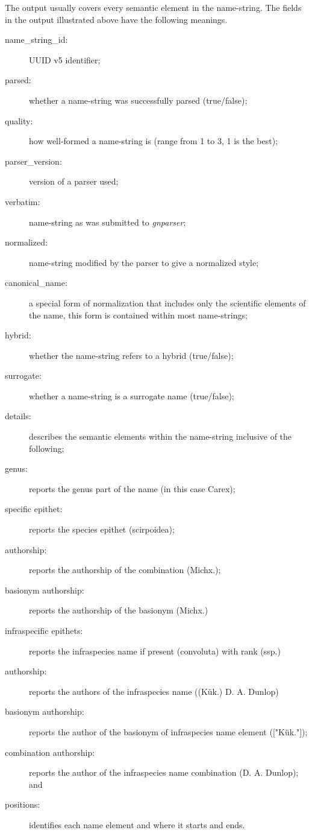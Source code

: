 \documentclass{bmcart}
\begin{document}
The output usually covers every semantic element in the name-string. The fields in the output illustrated above have the following meanings.

\begin{description}

  \item[name\_string\_id:] UUID v5 identifier;

  \item[parsed:] whether a name-string was successfully parsed (true/false);

  \item[quality:] how well-formed a name-string is (range from 1 to 3, 1 is the best);

  \item[parser\_version:] version of a parser used; \item[verbatim:] name-string as was submitted to \textit{gnparser}; \item[normalized:] name-string modified by the parser to give a normalized style;

  \item[canonical\_name:] a special form of normalization that includes only the scientific elements of the name, this form is contained within most name-strings; \item[hybrid:] whether the name-string refers to a hybrid (true/false); \item[surrogate:] whether a name-string is a surrogate name (true/false); \item[details:] describes the semantic elements within the name-string inclusive of the following;

  \item[genus:] reports the genus part of the name (in this case Carex);

  \item[specific epithet:] reports the species epithet (scirpoidea);

  \item[authorship:] reports the authorship of the combination (Michx.);

  \item[basionym authorship:] reports the authorship of the basionym (Michx.)

  \item[infraspecific epithets:] reports the infraspecies name if present (convoluta) with rank (ssp.) \item[authorship:] reports the authors of the infraspecies name ((Kük.) D. A. Dunlop) \item[basionym authorship:] reports the author of the basionym of infraspecies name element (["Kük."]);

  \item[combination authorship:] reports the author of the infraspecies name combination (D. A. Dunlop); and \item[positions:] identifies each name element and where it starts and ends.

\end{description}
\end{document}
